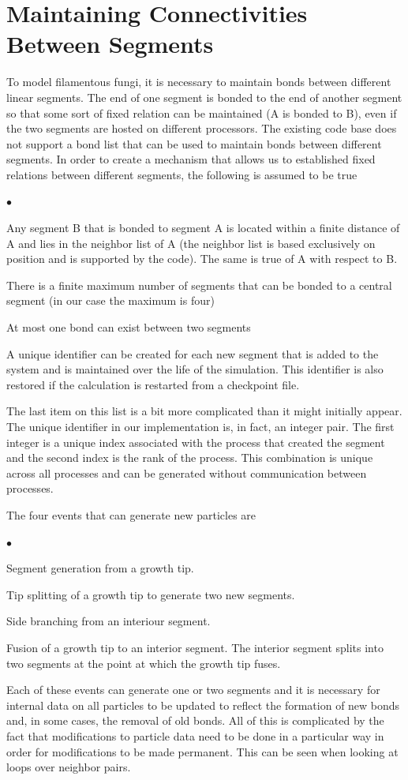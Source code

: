\documentclass[12pt]{article}
\begin{document}
\section{Maintaining Connectivities Between Segments}
To model filamentous fungi, it is necessary to maintain bonds between
different linear segments. The end of one segment is bonded to the end of another
segment so that some sort of fixed relation can be maintained (A is bonded to B),
even if the two segments are hosted on different processors. The existing code
base does not support a bond list that can be used to maintain bonds
between different segments. In order to create a mechanism that allows us to
established fixed relations between different segments, the following is assumed
to be true
\begin{list}{$\bullet$}{}
\item Any segment B that is bonded to segment A is located within a finite
distance of A and lies in the neighbor list of A (the neighbor list is based
exclusively on position and is supported by the code). The same is true of A with
respect to B.
\item There is a finite maximum number of segments that can be bonded to a
central segment (in our case the maximum is four)
\item At most one bond can exist between two segments
\item A unique identifier can be created for each new segment that is added to the
system and is maintained over the life of the simulation. This identifier is also
restored if the calculation is restarted from a checkpoint file.
\end{list}
The last item on this list is a bit more complicated than it might initially appear.
The unique identifier in our implementation is, in fact, an integer pair. The first
integer is a unique index associated with the process that created the segment and
the second index is the rank of the process. This combination is unique across all
processes and can be generated without communication between processes.

The four events that can generate new particles are
\begin{list}{$\bullet$}{}
\item Segment generation from a growth tip.
\item Tip splitting of a growth tip to generate two new segments.
\item Side branching from an interiour segment.
\item Fusion of a growth tip to an interior segment. The interior segment splits
into two segments at the point at which the growth tip fuses.
\end{list}
Each of these events can generate one or two segments and it is necessary for internal data
on all particles to be updated to reflect the formation of new bonds and, in some cases,
the removal of old bonds. All of this is complicated by the fact that modifications to
particle data need to be done in a particular way in order for modifications to be made
permanent. This can be seen when looking at loops over neighbor pairs.
\end{document}
